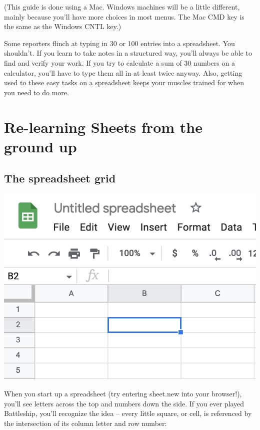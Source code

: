 \documentclass[
  letterpaper,
  DIV=11,
  numbers=noendperiod]{scrreprt}
\begin{document}
(This guide is done using a Mac. Windows machines will be a little
different, mainly because you'll have more choices in most menus. The
Mac CMD key is the same as the Windows CNTL key.)

Some reporters flinch at typing in 30 or 100 entries into a spreadsheet.
You shouldn't. If you learn to take notes in a structured way, you'll
always be able to find and verify your work. If you try to calculate a
sum of 30 numbers on a calculator, you'll have to type them all in at
least twice anyway. Also, getting used to these easy tasks on a
spreadsheet keeps your muscles trained for when you need to do more.

\hypertarget{re-learning-sheets-from-the-ground-up}{%
\section{Re-learning Sheets from the ground
up}\label{re-learning-sheets-from-the-ground-up}}

\hypertarget{the-spreadsheet-grid}{%
\subsection{The spreadsheet grid}\label{the-spreadsheet-grid}}

\includegraphics{./images/sheets-refresher-battleship.png}

When you start up a spreadsheet (try entering sheet.new into your
browser!), you'll see letters across the top and numbers down the side.
If you ever played Battleship, you'll recognize the idea -- every little
square, or cell, is referenced by the intersection of its column letter
and row number:
\end{document}
